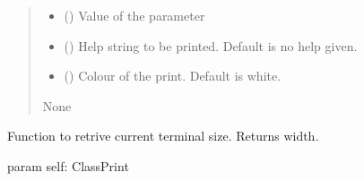 \documentclass[letterpaper,10pt,english]{sphinxmanual}
\begin{document}
\begin{fulllineitems}
\begin{fulllineitems}
\begin{quote}
\begin{description}
\begin{itemize}
\item {} 
\sphinxAtStartPar
{} () \textendash{} Value of the parameter

\item {} 
\sphinxAtStartPar
{} () \textendash{} Help string to be printed. Default is no help given.

\item {} 
\sphinxAtStartPar
{} () \textendash{} Colour of the print. Default is white.

\end{itemize}

\sphinxAtStartPar
None

\end{description}\end{quote}

\end{fulllineitems}


\begin{fulllineitems}
\label{\detokenize{api/killMS.Parset:killMS.Parset.ClassPrint.ClassPrint.getWidth}}
\pysigstartsignatures
{}
\pysigstopsignatures
\sphinxAtStartPar
Function to retrive current terminal size. Returns width.

\sphinxAtStartPar
param self: ClassPrint
\begin{quote}\begin{description}
\sphinxAtStartPar
{}

\end{description}\end{quote}

\end{fulllineitems}


\end{fulllineitems}
\end{document}

